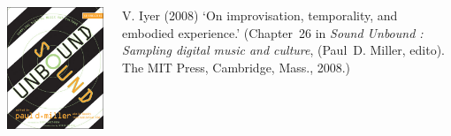 \documentclass[]{beamer}
\begin{document}
\begin{frame}%

  \begin{columns}
      \begin{center}
        \includegraphics[width=.9\textwidth]{img/sound-unbound.jpg}
      \end{center}
    \begin{thebibliography}{Vijay Iyer, 2008}
     V. Iyer (2008) \newblock `On
      improvisation, temporality, and embodied experience.'  \newblock
      (Chapter~26 in \emph{Sound Unbound : Sampling digital music and
        culture}, (Paul~D. Miller, edito). The MIT Press, Cambridge, Mass.,
      2008.)
    
      \end{thebibliography}
  \end{columns}
\end{frame}
\end{document}
